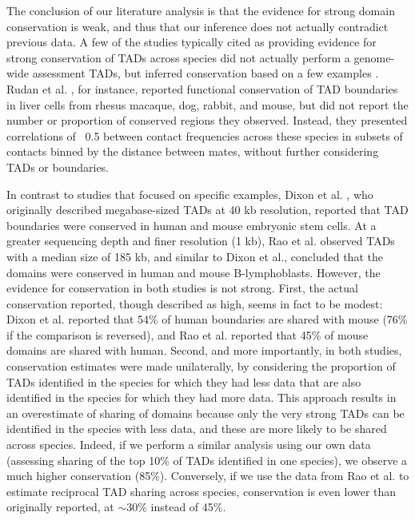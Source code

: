 The conclusion of our literature analysis is that the evidence for strong domain conservation is weak, and thus that our inference does not actually contradict previous data. A few of the studies typically cited as providing evidence for strong conservation of TADs across species did not actually perform a genome-wide assessment TADs, but inferred conservation based on a few examples \cite{Rudan.2015, Harmston.2017, Gomez-marin.2015}. Rudan et al. \cite{Rudan.2015}, for instance, reported functional conservation of TAD boundaries in liver cells from rhesus macaque, dog, rabbit, and mouse, but did not report the number or proportion of conserved regions they observed. Instead, they presented correlations of ~0.5 between contact frequencies across these species in subsets of contacts binned by the distance between mates, without further considering TADs or boundaries.

In contrast to studies that focused on specific examples, Dixon et al. \cite{Dixon.2012}, who originally described megabase-sized TADs at 40 kb resolution, reported that TAD boundaries were conserved in human and mouse embryonic stem cells. At a greater sequencing depth and finer resolution (1 kb), Rao et al. \cite{Rao.2014} observed TADs with a median size of 185 kb, and similar to Dixon et al., concluded that the domains were conserved in human and mouse B-lymphoblasts. However, the evidence for conservation in both studies is not strong. First, the actual conservation reported, though described as high, seems in fact to be modest: Dixon et al. reported that 54\% of human boundaries are shared with mouse (76\% if the comparison is reversed), and Rao et al. reported that 45\% of mouse domains are shared with human. Second, and more importantly, in both studies, conservation estimates were made unilaterally, by considering the proportion of TADs identified in the species for which they had less data that are also identified in the species for which they had more data. This approach results in an overestimate of sharing of domains because only the very strong TADs can be identified in the species with less data, and these are more likely to be shared across species. Indeed, if we perform a similar analysis using our own data (assessing sharing of the top 10\% of TADs identified in one species), we observe a much higher conservation (85\%). Conversely, if we use the data from Rao et al. to estimate reciprocal TAD sharing across species, conservation is even lower than originally reported, at $\sim$30\% instead of 45\%.

